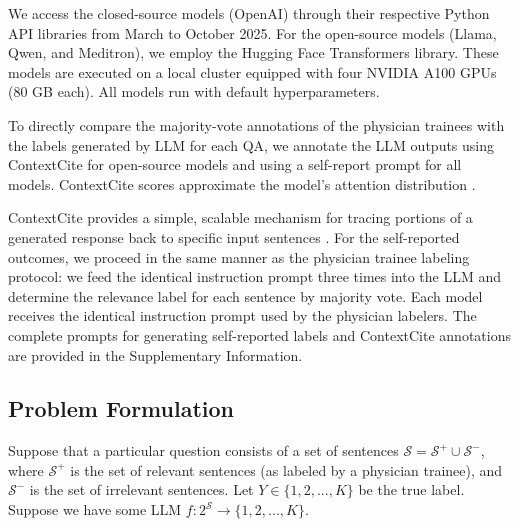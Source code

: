 \documentclass[fleqn,10pt]{wlscirep}
\begin{document}
We access the closed-source models (OpenAI) through their respective Python API libraries from March to October 2025. For the open-source models (Llama, Qwen, and Meditron), we employ the Hugging Face Transformers library. These models are executed on a local cluster equipped with four NVIDIA A100 GPUs (80 GB each). All models run with default hyperparameters.

To directly compare the majority-vote annotations of the physician trainees with the labels generated by LLM for each QA, we annotate the LLM outputs using ContextCite for open-source models and using a self-report prompt for all models. ContextCite scores approximate the model's attention distribution \cite{bohnet_attributed_2023}.

ContextCite provides a simple, scalable mechanism for tracing portions of a generated response back to specific input sentences \cite{cohen-wang_contextcite_2024}. For the self-reported outcomes, we proceed in the same manner as the physician trainee labeling protocol: we feed the identical instruction prompt three times into the LLM and determine the relevance label for each sentence by majority vote. Each model receives the identical instruction prompt used by the physician labelers. The complete prompts for generating self-reported labels and ContextCite annotations are provided in the Supplementary Information.

\subsection{Problem Formulation}

Suppose that a particular question consists of a set of sentences $\mathcal{S} = \mathcal{S}^+ \cup \mathcal{S}^-$, where $\mathcal{S}^+$ is the set of relevant sentences (as labeled by a physician trainee), and $\mathcal{S}^-$ is the set of irrelevant sentences. Let $Y \in \{1, 2, ..., K\}$ be the true label. Suppose we have some LLM $f: 2^{\mathcal{S}} \rightarrow \{1, 2, ..., K\}$.
\end{document}
